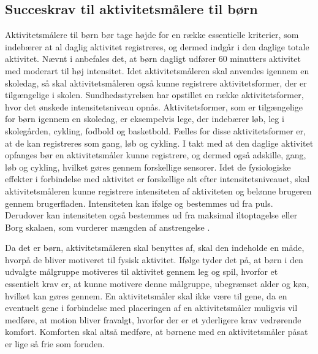 \subsection{Succeskrav til aktivitetsmålere til børn} \label{succeskrav}

Aktivitetsmålere til børn bør tage højde for en række essentielle kriterier, som indebærer at al daglig aktivitet registreres, og dermed indgår i den daglige totale aktivitet. Nævnt i  anbefales det, at børn dagligt udfører 60 minutters aktivitet med moderart til høj intensitet. Idet aktivitetsmåleren skal anvendes igennem en skoledag, så skal aktivitetsmåleren også kunne registrere aktivitetsformer, der er tilgængelige i skolen. Sundhedsstyrelsen har opstillet en række aktivitetsformer, hvor det ønskede intensitetsniveau opnås. Aktivitetsformer, som er tilgængelige for børn igennem en skoledag, er eksempelvis lege, der indebærer løb, leg i skolegården, cykling, fodbold og basketbold. Fælles for disse aktivitetsformer er, at de kan registreres som gang, løb og cykling. \citep{Sundhedsstyrrelsen2003}
I takt med at den daglige aktivitet opfanges bør en aktivitetsmåler kunne registrere, og dermed også adskille, gang, løb og cykling, hvilket gøres gennem forskellige sensorer. 
Idet de fysiologiske effekter i forbindelse med aktivitet er forskellige alt efter intensitetsniveauet, skal aktivitetsmåleren kunne registrere intensiteten af aktiviteten og belønne brugeren gennem brugerfladen. Intensiteten kan ifølge  og  bestemmes ud fra puls. Derudover kan intensiteten også bestemmes ud fra maksimal iltoptagelse eller Borg skalaen, som vurderer mængden af anstrengelse \citep{Kiens2007}. 

Da det er børn, aktivitetsmåleren skal benyttes af, skal den indeholde en måde, hvorpå de bliver motiveret til fysisk aktivitet. Ifølge  tyder det på, at børn i den udvalgte målgruppe motiveres til aktivitet gennem leg og spil, hvorfor et essentielt krav er, at kunne motivere denne målgruppe, ubegrænset alder og køn, hvilket kan gøres gennem. \newline
En aktivitetsmåler skal ikke være til gene, da en eventuelt gene i forbindelse med placeringen af en aktivitetsmåler muligvis vil medføre, at motion bliver fravalgt, hvorfor der er et yderligere krav vedrørende komfort. Komforten skal altså medføre, at børnene med en aktivitetsmåler påsat er lige så frie som foruden.

